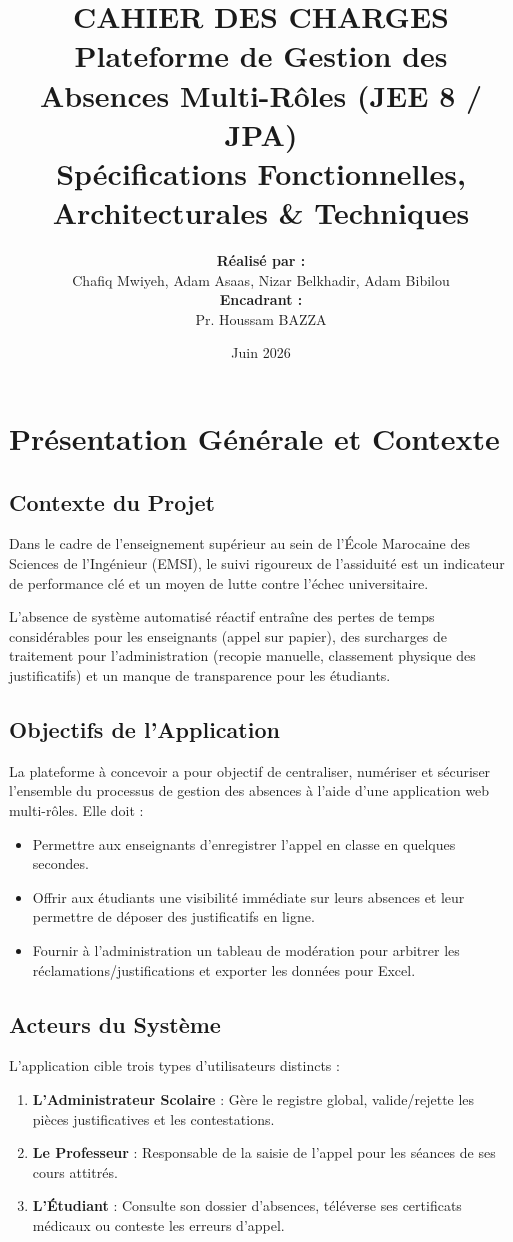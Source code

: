 \documentclass[12pt,a4paper]{article}
\title{
    \vspace{2cm}
    \textbf{\Huge CAHIER DES CHARGES}\\[0.5cm]
    \Large Plateforme de Gestion des Absences Multi-Rôles (JEE 8 / JPA)\\[1.5cm]
    \large\textbf{Spécifications Fonctionnelles, Architecturales \& Techniques}
    \vspace{1cm}
}
\author{
    \textbf{Réalisé par :}\\
    Chafiq Mwiyeh, Adam Asaas, Nizar Belkhadir, Adam Bibilou \\[0.5cm]
    \textbf{Encadrant :}\\
    Pr. Houssam BAZZA
}
\date{Juin 2026}
\begin{document}
\maketitle
\thispagestyle{empty}
\newpage

\tableofcontents
\newpage

\section{Présentation Générale et Contexte}

\subsection{Contexte du Projet}
Dans le cadre de l'enseignement supérieur au sein de l'École Marocaine des Sciences de l'Ingénieur (EMSI), le suivi rigoureux de l'assiduité est un indicateur de performance clé et un moyen de lutte contre l'échec universitaire. 

L'absence de système automatisé réactif entraîne des pertes de temps considérables pour les enseignants (appel sur papier), des surcharges de traitement pour l'administration (recopie manuelle, classement physique des justificatifs) et un manque de transparence pour les étudiants.

\subsection{Objectifs de l'Application}
La plateforme à concevoir a pour objectif de centraliser, numériser et sécuriser l'ensemble du processus de gestion des absences à l'aide d'une application web multi-rôles. Elle doit :
\begin{itemize}
    \item Permettre aux enseignants d'enregistrer l'appel en classe en quelques secondes.
    \item Offrir aux étudiants une visibilité immédiate sur leurs absences et leur permettre de déposer des justificatifs en ligne.
    \item Fournir à l'administration un tableau de modération pour arbitrer les réclamations/justifications et exporter les données pour Excel.
\end{itemize}

\subsection{Acteurs du Système}
L'application cible trois types d'utilisateurs distincts :
\begin{enumerate}
    \item \textbf{L'Administrateur Scolaire} : Gère le registre global, valide/rejette les pièces justificatives et les contestations.
    \item \textbf{Le Professeur} : Responsable de la saisie de l'appel pour les séances de ses cours attitrés.
    \item \textbf{L'Étudiant} : Consulte son dossier d'absences, téléverse ses certificats médicaux ou conteste les erreurs d'appel.
\end{enumerate}
\end{document}
